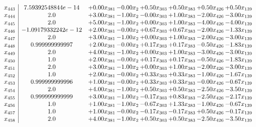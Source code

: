 \documentclass[8pt]{article}
\begin{document}
\[\begin{array}{c| c c@{\hskip 2pt} c@{\hskip 2pt} c@{\hskip 2pt} c@{\hskip 2pt} c@{\hskip 2pt} c@{\hskip 2pt} }
 x_{443}   &  7.59392548844e-14 & +  0.00 x_{381} & -0.00 x_{2} & +  0.50 x_{303} & +  0.50 x_{383} & +  0.50 x_{426} & +  0.50 x_{139}\\
 x_{444}   &  2.0 & +  3.00 x_{381} & -1.00 x_{2} & -0.00 x_{303} & +  1.00 x_{383} & -2.00 x_{426} & -3.00 x_{139}\\
 x_{445}   &  2.0 & +  5.00 x_{381} & -1.00 x_{2} & +  0.00 x_{303} & +  1.00 x_{383} & -4.00 x_{426} & -4.00 x_{139}\\
 x_{446}   &  -1.09179332242e-12 & +  2.00 x_{381} & -0.00 x_{2} & +  0.67 x_{303} & +  0.67 x_{383} & -2.00 x_{426} & -1.33 x_{139}\\
 x_{447}   &  2.0 & +  3.00 x_{381} & -1.00 x_{2} & +  0.00 x_{303} & +  1.00 x_{383} & -2.00 x_{426} & -3.00 x_{139}\\
 x_{448}   &  0.999999999997 & +  2.00 x_{381} & -0.00 x_{2} & +  0.17 x_{303} & +  0.17 x_{383} & -0.50 x_{426} & -1.83 x_{139}\\
 x_{449}   &  2.0 & +  4.00 x_{381} & -1.00 x_{2} & +  0.00 x_{303} & +  1.00 x_{383} & -3.00 x_{426} & -3.00 x_{139}\\
 x_{450}   &  1.0 & +  2.00 x_{381} & -0.00 x_{2} & +  0.17 x_{303} & +  0.17 x_{383} & -0.50 x_{426} & -1.83 x_{139}\\
 x_{451}   &  2.0 & +  3.00 x_{381} & -1.00 x_{2} & +  0.00 x_{303} & +  1.00 x_{383} & -2.00 x_{426} & -3.00 x_{139}\\
 x_{452}   &  1.0 & +  2.00 x_{381} & -0.00 x_{2} & +  0.33 x_{303} & +  0.33 x_{383} & -1.00 x_{426} & -1.67 x_{139}\\
 x_{453}   &  0.999999999996 & +  1.00 x_{381} & -0.00 x_{2} & +  0.33 x_{303} & +  0.33 x_{383} & -0.00 x_{426} & -0.67 x_{139}\\
 x_{454}   &  2.0 & +  4.00 x_{381} & -1.00 x_{2} & +  0.50 x_{303} & +  0.50 x_{383} & -2.50 x_{426} & -3.50 x_{139}\\
 x_{455}   &  0.999999999999 & +  3.00 x_{381} & -1.00 x_{2} & -0.17 x_{303} & +  0.83 x_{383} & -2.50 x_{426} & -2.17 x_{139}\\
 x_{456}   &  1.0 & +  1.00 x_{381} & -1.00 x_{2} & -0.67 x_{303} & +  1.33 x_{383} & -1.00 x_{426} & -0.67 x_{139}\\
 x_{457}   &  1.0 & +  1.00 x_{381} & -0.00 x_{2} & -0.17 x_{303} & -0.17 x_{383} & +  0.50 x_{426} & -0.17 x_{139}\\
 x_{458}   &  2.0 & +  4.00 x_{381} & -1.00 x_{2} & +  0.50 x_{303} & +  0.50 x_{383} & -2.50 x_{426} & -3.50 x_{139}\\

\end{array}\]
\end{document}
